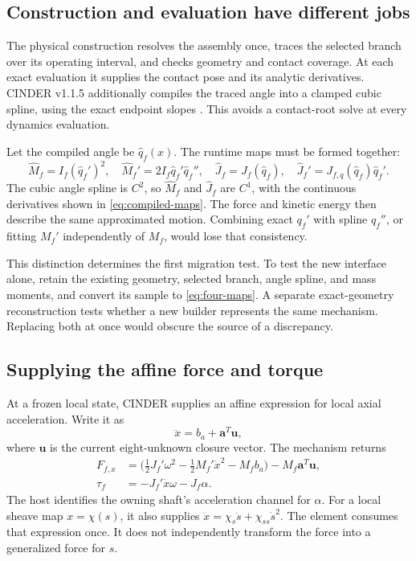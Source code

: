 \documentclass[11pt,letterpaper]{article}
\numberwithin{equation}{section}
\newcommand{\half}{\tfrac12}
\begin{document}
\subsection{Construction and evaluation have different jobs}

The physical construction resolves the assembly once, traces the selected branch over its operating interval, and checks geometry and contact coverage. At each exact evaluation it supplies the contact pose and its analytic derivatives. CINDER v1.1.5 additionally compiles the traced angle into a clamped cubic spline, using the exact endpoint slopes \cite{implementation}. This avoids a contact-root solve at every dynamics evaluation.

Let the compiled angle be $\widehat q_f(x)$. The runtime maps must be formed together:
\begin{equation}
  \widehat M_f=I_f(\widehat q_f')^2,\quad
  \widehat M_f'=2I_f\widehat q_f'\widehat q_f'',\quad
  \widehat J_f=J_f(\widehat q_f),\quad
  \widehat J_f'=J_{f,q}(\widehat q_f)\widehat q_f'.
  \label{eq:compiled-maps}
\end{equation}
The cubic angle spline is $C^2$, so $\widehat M_f$ and $\widehat J_f$ are $C^1$, with the continuous derivatives shown in \cref{eq:compiled-maps}. The force and kinetic energy then describe the same approximated motion. Combining exact $q_f'$ with spline $q_f''$, or fitting $M_f'$ independently of $M_f$, would lose that consistency.

This distinction determines the first migration test. To test the new interface alone, retain the existing geometry, selected branch, angle spline, and mass moments, and convert its sample to \cref{eq:four-maps}. A separate exact-geometry reconstruction tests whether a new builder represents the same mechanism. Replacing both at once would obscure the source of a discrepancy.

\subsection{Supplying the affine force and torque}

At a frozen local state, CINDER supplies an affine expression for local axial acceleration. Write it as
\begin{equation}
  \ddot x=b_a+\bm a^{T}\bm u,
\end{equation}
where $\bm u$ is the current eight-unknown closure vector. The mechanism returns
\begin{align}
  F_{f,x}
     &=\bigl(\half J_f'\omega^2-\half M_f'\dot x^2-M_fb_a\bigr)
          -M_f\bm a^T\bm u,\label{eq:affine-force}\\
  \tau_f&=-J_f'\dot x\omega-J_f\alpha.\label{eq:affine-torque}
\end{align}
The host identifies the owning shaft's acceleration channel for $\alpha$. For a local sheave map $x=\chi(s)$, it also supplies
$\ddot x=\chi_s\ddot s+\chi_{ss}\dot s^2$.
The element consumes that expression once. It does not independently transform the force into a generalized force for $s$.
\end{document}
